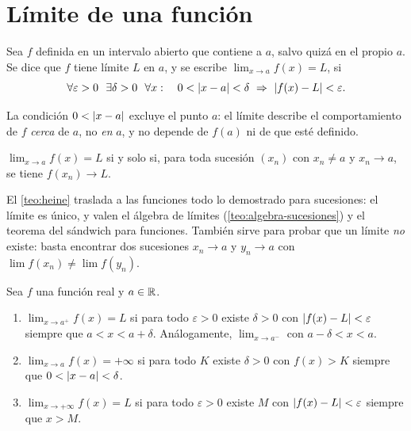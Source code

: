 \section{Límite de una función}

\begin{definicion}\label{def:limite-funcion}
Sea $f$ definida en un intervalo abierto que contiene a $a$, salvo quizá en el propio $a$. Se dice que $f$ tiene límite $L$ en $a$, y se escribe $\lim_{x\to a}f(x)=L$, si
\[
\forall\varepsilon>0\ \ \exists\delta>0\ \ \forall x:\quad 0<\abs{x-a}<\delta\ \Rightarrow\ \abs{f(x)-L}<\varepsilon.
\]
\end{definicion}

La condición $0<\lvert x-a\rvert$ excluye el punto $a$: el límite describe el comportamiento de $f$ \emph{cerca} de $a$, no \emph{en} $a$, y no depende de $f(a)$ ni de que esté definido.

\addtocounter{definicion}{1}%

\addtocounter{definicion}{1}%

\begin{teorema}\label{teo:heine}
$\lim_{x\to a}f(x)=L$ si y solo si, para toda sucesión $(x_n)$ con $x_n\ne a$ y $x_n\to a$, se tiene $f(x_n)\to L$.
\end{teorema}

El \cref{teo:heine} traslada a las funciones todo lo demostrado para sucesiones: el límite es único, y valen el álgebra de límites (\cref{teo:algebra-sucesiones}) y el teorema del sándwich para funciones. También sirve para probar que un límite \emph{no} existe: basta encontrar dos sucesiones $x_n\to a$ y $y_n\to a$ con $\lim f(x_n)\ne\lim f(y_n)$.

\addtocounter{definicion}{1}%

\begin{definicion}\label{def:limites-variantes}
Sea $f$ una función real y $a\in\mathbb{R}$.
\begin{enumerate}
  \item $\lim_{x\to a^{+}}f(x)=L$ si para todo $\varepsilon>0$ existe $\delta>0$ con $\lvert f(x)-L\rvert<\varepsilon$ siempre que $a<x<a+\delta$. Análogamente, $\lim_{x\to a^{-}}$ con $a-\delta<x<a$.
  \item $\lim_{x\to a}f(x)=+\infty$ si para todo $K$ existe $\delta>0$ con $f(x)>K$ siempre que $0<\lvert x-a\rvert<\delta$.
  \item $\lim_{x\to+\infty}f(x)=L$ si para todo $\varepsilon>0$ existe $M$ con $\lvert f(x)-L\rvert<\varepsilon$ siempre que $x>M$.
\end{enumerate}
\end{definicion}

